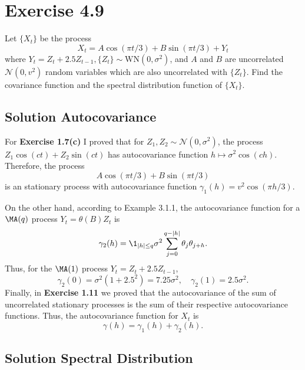 \section*{Exercise 4.9}

Let \(\{X_t\}\) be the process
\[
X_t = A\cos(\pi t / 3) + B\sin(\pi t / 3) + Y_t
\]
where \(Y_t = Z_t + 2.5Z_{t-1}, \{Z_t\} \sim \mathrm{WN}(0, \sigma^2)\), and \(A\) and \(B\) are uncorrelated 
\(\mathcal{N}(0, v^2)\) random variables which are also uncorrelated with \(\{Z_t\}\). Find the covariance 
function and the spectral distribution function of \(\{X_t\}\).

\subsection*{Solution Autocovariance}

For \textbf{Exercise 1.7(c)} I proved that for $Z_1, Z_2 \sim \mathcal{N}(0,\sigma^2)$, the process $Z_1 \cos(ct) + Z_2 \sin(ct)$ has autocovariance function $h \mapsto \sigma^2 \cos(ch)$. Therefore, the process
\[  A\cos(\pi t / 3) + B\sin(\pi t / 3) \]
is an stationary process with autocovariance function $\gamma_1(h) = v^2 \cos(\pi h/3)$.

On the other hand, according to Example 3.1.1, the autocovariance function for a $\MA(q)$ process $Y_t = \theta(B)Z_t$ is
\[ \gamma_2(h) = \1_{|h| \leq q} \sigma^2 \sum_{j = 0}^{q-|h|}\theta_j \theta_{j+h}. \]
Thus, for the $\MA(1)$ process $Y_t = Z_t + 2.5 Z_{t-1}$,
\[ \gamma_2(0) = \sigma^2 (1+2.5^2) = 7.25\sigma^2,\quad \gamma_2(1) = 2.5 \sigma^2. \]
Finally, in\textbf{ Exercise 1.11} we proved that the autocovariance of the sum of uncorrelated stationary processes is the sum of their respective autocovariance functions. Thus, the autocovariance function for $X_t$ is
\[ \gamma(h) = \gamma_1(h) + \gamma_2(h). \]

\subsection*{Solution Spectral Distribution}

